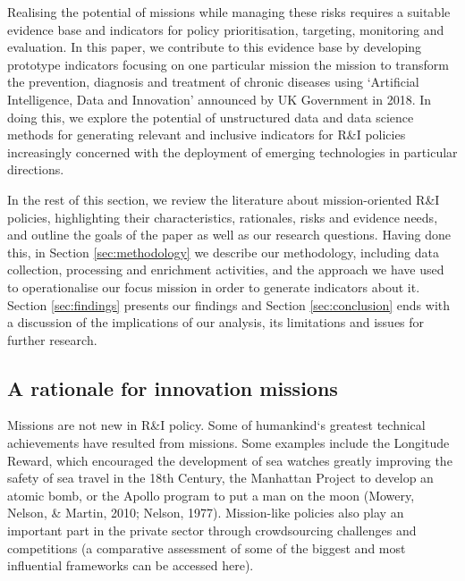 \documentclass[11pt]{article}
\begin{document}
Realising the potential of missions while managing these risks requires a suitable evidence base and indicators for policy prioritisation, targeting, monitoring and evaluation. In this paper, we contribute to this evidence base by developing prototype indicators focusing on one particular mission \- the mission to transform the prevention, diagnosis and treatment of chronic diseases using `Artificial Intelligence, Data and Innovation' announced by UK Government in 2018. In doing this, we explore the potential of unstructured data and data science methods for generating relevant and inclusive indicators for R\&I policies increasingly concerned with the deployment of emerging technologies in particular directions. 

In the rest of this section, we review the literature about mission-oriented R\&I policies, highlighting their characteristics, rationales, risks and evidence needs, and outline the goals of the paper as well as our research questions. Having done this, in Section \ref{sec:methodology} we describe our methodology, including data collection, processing and enrichment activities, and the approach we have used to operationalise our focus mission in order to generate indicators about it. Section \ref{sec:findings} presents our findings and Section \ref{sec:conclusion} ends with a discussion of the implications of our analysis, its limitations and issues for further research.

\subsection{A rationale for innovation missions}
\label{subsec: history}

Missions are not new in R\&I policy. Some of humankind`s greatest technical achievements have resulted from missions. Some examples include the Longitude Reward, which encouraged the development of sea watches greatly improving the safety of sea travel in the 18th Century, the Manhattan Project to develop an atomic bomb, or the Apollo program to put a man on the moon (Mowery, Nelson, \& Martin, 2010; Nelson, 1977). Mission-like policies also play an important part in the private sector through crowdsourcing challenges and competitions (a comparative assessment of some of the biggest and most influential frameworks can be accessed  here). 
\end{document}
